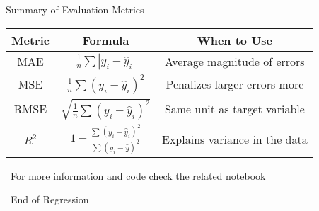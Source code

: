\documentclass[serif, aspectratio=169]{beamer}
\begin{document}
\begin{frame}{Summary of Evaluation Metrics}
\begin{table}[]
\centering
\begin{tabular}{|c|c|c|}
\hline
\textbf{Metric} & \textbf{Formula} & \textbf{When to Use} \\
\hline
MAE & $\frac{1}{n} \sum |y_i - \hat{y}_i|$ & Average magnitude of errors \\
MSE & $\frac{1}{n} \sum (y_i - \hat{y}_i)^2$ & Penalizes larger errors more \\
RMSE & $\sqrt{\frac{1}{n} \sum (y_i - \hat{y}_i)^2}$ & Same unit as target variable \\
$R^2$ & $1 - \frac{\sum (y_i - \hat{y}_i)^2}{\sum (y_i - \bar{y})^2}$ & Explains variance in the data \\
\hline
\end{tabular}
\end{table}
\end{frame}


\begin{frame}
    \begin{center}
        {\Huge\ \color{red}For more information and code check the related notebook}
    \end{center}
\end{frame}


\begin{frame}
    \begin{center}
        {\Huge\ End of Regression}
    \end{center}
\end{frame}
\end{document}
